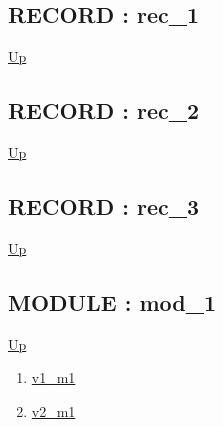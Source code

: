\subsection*{RECORD : rec\_1}
\hypertarget{ecldoc:intest.inintest.example_2.rec_1}{}
\par
\begin{minipage}[t]{\textwidth}
\begin{flushleft}
  
\end{flushleft}
\end{minipage}
\hyperlink{ecldoc:intest.inintest.example_2}{Up} \\
\par
\par
\subsection*{RECORD : rec\_2}
\hypertarget{ecldoc:intest.inintest.example_2.rec_2}{}
\par
\begin{minipage}[t]{\textwidth}
\begin{flushleft}
  
\end{flushleft}
\end{minipage}
\hyperlink{ecldoc:intest.inintest.example_2}{Up} \\
\par
\par
\subsection*{RECORD : rec\_3}
\hypertarget{ecldoc:intest.inintest.example_2.rec_3}{}
\par
\begin{minipage}[t]{\textwidth}
\begin{flushleft}
  
\end{flushleft}
\end{minipage}
\hyperlink{ecldoc:intest.inintest.example_2}{Up} \\
\par
\par
\subsection*{MODULE : mod\_1}
\hypertarget{ecldoc:intest.inintest.example_2.mod_1}{}
\par
\begin{minipage}[t]{\textwidth}
\begin{flushleft}
  
\end{flushleft}
\end{minipage}
\hyperlink{ecldoc:intest.inintest.example_2}{Up} \\
\par
\par
\begin{enumerate}
\item \hyperlink{ecldoc:intest.inintest.example_2.mod_1.v1_m1}{v1\_m1}
\item \hyperlink{ecldoc:intest.inintest.example_2.mod_1.v2_m1}{v2\_m1}
\end{enumerate}
